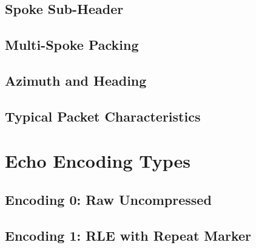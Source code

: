 \documentclass[11pt,letterpaper]{article}
\begin{document}

\subsection{Spoke Sub-Header}
\label{subsec:spoke-subheader}


\subsection{Multi-Spoke Packing}
\label{subsec:multi-spoke}


\subsection{Azimuth and Heading}
\label{subsec:azimuth-heading}


\subsection{Typical Packet Characteristics}
\label{subsec:echo-packet-characteristics}



\newpage
\section{Echo Encoding Types}
\label{sec:echo-encoding}


\subsection{Encoding 0: Raw Uncompressed}
\label{subsec:encoding-0}


\subsection{Encoding 1: RLE with Repeat Marker}
\label{subsec:encoding-1}
\end{document}
